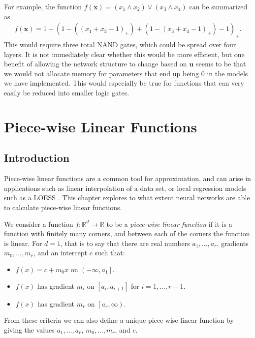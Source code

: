 \documentclass{somasmsc}
\begin{document}
For example, the function $f(\pmb{x}) = \left(x_1 \land x_2\right) \lor \left(x_3 \land x_4\right)$ can be summarized as
\begin{align*}
f(\pmb{x}) = 1 - \left(1 - \left(\left(x_1 + x_2 - 1\right)_+\right) + \left(1 - \left(x_3 + x_4 - 1\right)_+\right) - 1\right)_+.
\end{align*}
This would require three total NAND gates, which could be spread over four layers. It is not immediately clear whether this would be more efficient, but one benefit of allowing the network structure to change based on $\pmb{u}$ seems to be that we would not allocate memory for parameters that end up being 0 in the models we have implemented. This would especially be true for functions that can very easily be reduced into smaller logic gates.


\chapter{Piece-wise Linear Functions}

\section{Introduction}

Piece-wise linear functions are a common tool for approximation, and can arise in applications such as linear interpolation of a data set, or local regression models such as a LOESS \citep{cleveland1979robust}. This chapter explores to what extent neural networks are able to calculate piece-wise linear functions.

We consider a function $f: \mathbb{R}^d \rightarrow \mathbb{R}$ to be a \textit{piece-wise linear function} if it is a function with finitely many corners, and between each of the corners the function is linear. For $d=1$, that is to say that there are real numbers $a_1, \dots, a_r$, gradients $m_0, \dots, m_r$, and an intercept $c$ such that:
\begin{itemize}
    \item $f(x) = c + m_0 x$ on $\left(-\infty, a_1\right]$.
    \item $f(x)$ has gradient $m_i$ on $\left[a_i, a_{i+1}\right]$ for $i=1, \dots, r-1$.
    \item $f(x)$ has gradient $m_r$ on $\left[a_r, \infty\right)$.
\end{itemize}
From these criteria we can also define a unique piece-wise linear function by giving the values $a_1, \dots, a_r$, $m_0, \dots, m_r$, and $c$.
\end{document}
